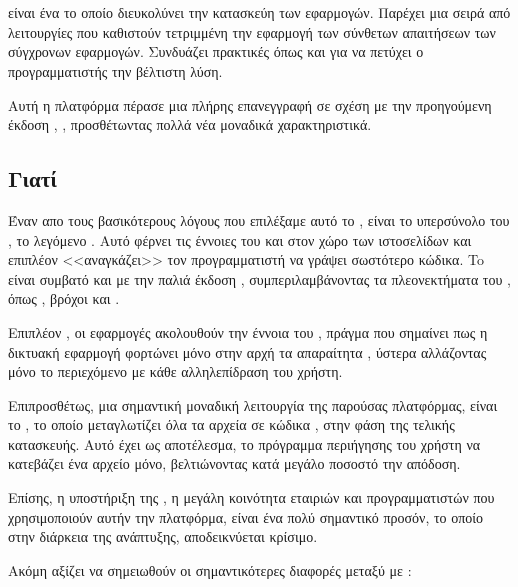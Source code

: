 \section{}
\quad {} είναι ένα  το οποίο διευκολύνει την κατασκεύη των  εφαρμογών. Παρέχει μια σειρά από λειτουργίες που καθιστούν τετριμμένη την εφαρμογή των σύνθετων απαιτήσεων των σύγχρονων εφαρμογών. Συνδυάζει πρακτικές όπως  και  για να πετύχει ο προγραμματιστής την βέλτιστη λύση.\par
Αυτή η πλατφόρμα πέρασε μια πλήρης επανεγγραφή σε σχέση με την προηγούμενη έκδοση , , προσθέτωντας πολλά νέα μοναδικά χαρακτηριστικά. 


\subsection*{Γιατί}
\quad Έναν απο τους βασικότερους λόγους που επιλέξαμε αυτό το  , είναι το υπερσύνολο του , το λεγόμενο . Αυτό φέρνει τις έννοιες του   και  στον χώρο των ιστοσελίδων και επιπλέον <<αναγκάζει>> τον προγραμματιστή να γράψει σωστότερο κώδικα.
To  είναι συμβατό και με την παλιά έκδοση  , συμπεριλαμβάνοντας τα πλεονεκτήματα του , όπως , βρόχοι  και .\par Επιπλέον , οι εφαρμογές  ακολουθούν την έννοια του , πράγμα που σημαίνει πως η δικτυακή εφαρμογή φορτώνει μόνο στην αρχή τα απαραίτητα , ύστερα αλλάζοντας μόνο το περιεχόμενο με κάθε αλληλεπίδραση του χρήστη.\par Επιπροσθέτως, μια σημαντική μοναδική λειτουργία της παρούσας πλατφόρμας, είναι το , το οποίο μεταγλωτίζει όλα τα αρχεία σε κώδικα , στην φάση της τελικής κατασκευής. Αυτό έχει ως αποτέλεσμα,  το πρόγραμμα περιήγησης του χρήστη να κατεβάζει ένα αρχείο μόνο, βελτιώνοντας κατά μεγάλο ποσοστό την απόδοση.\par Επίσης, η υποστήριξη της , η μεγάλη κοινότητα εταιριών και προγραμματιστών που χρησιμοποιούν αυτήν την πλατφόρμα, είναι ένα πολύ σημαντικό προσόν, το οποίο στην διάρκεια της ανάπτυξης, αποδεικνύεται κρίσιμο.\par
Ακόμη αξίζει να σημειωθούν οι σημαντικότερες διαφορές μεταξύ  με :
